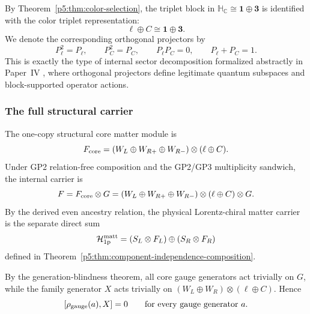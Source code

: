 \documentclass[12pt,a4paper]{article}
\begin{document}
By Theorem~\ref{p5:thm:color-selection}, the triplet block in
\(
\mathbb H_{\mathbb C}\cong \mathbf 1\oplus \mathbf 3
\)
is identified with the color triplet representation:
\begin{equation}
\label{p5:eq:part1-color-split}
\ell\oplus C
\cong
\mathbf 1\oplus \mathbf 3.
\end{equation}
We denote the corresponding orthogonal projectors by
\begin{equation}
P_\ell^2=P_\ell,\qquad P_C^2=P_C,\qquad P_\ell P_C=0,\qquad P_\ell+P_C=1.
\end{equation}
This is exactly the type of internal sector decomposition formalized abstractly in Paper~IV \cite{Kugelmann2026e}, where orthogonal projectors define legitimate quantum subspaces and block-supported operator actions.

\subsubsection{The full structural carrier}
\label{p5:sec:part1-full-carrier}

The one-copy structural core matter module is
\begin{equation}
\label{p5:eq:part1-finite-core-carrier}
F_{\rm core}
=
(W_L\oplus W_{R+}\oplus W_{R-})\otimes(\ell\oplus C).
\end{equation}
Under GP2 relation-free composition and the GP2/GP3 multiplicity sandwich,
the internal carrier is
\begin{equation}
\label{p5:eq:part1-full-carrier}
F=F_{\rm core}\otimes G
=
(W_L\oplus W_{R+}\oplus W_{R-})\otimes(\ell\oplus C)\otimes G.
\end{equation}
By the derived even ancestry relation, the physical Lorentz-chiral matter carrier is the
separate direct sum
\[
\mathcal H_{\rm 1p}^{\rm matt}
=(S_L\otimes F_L)\oplus(S_R\otimes F_R)
\]
defined in Theorem~\ref{p5:thm:component-independence-composition}.

\begin{proposition}
\label{p5:prop:core-family-separation}
By the generation-blindness theorem, all core gauge generators act
trivially on \(G\), while the family generator \(X\) acts trivially on
\(
(W_L\oplus W_R)\otimes(\ell\oplus C).
\)
Hence
\begin{equation}
\label{p5:eq:part1-core-family-comm}
[\rho_{\rm gauge}(a),X]=0
\qquad
\text{for every gauge generator }a.
\end{equation}
\end{proposition}
\end{document}
